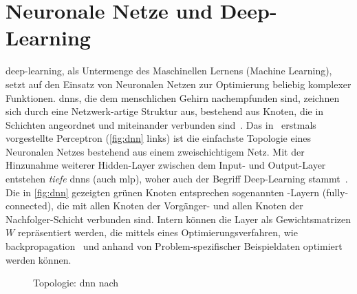 \section{Neuronale Netze und Deep-Learning}
\label{sec:deep-learning}

\gls{deep-learning}, als Untermenge des Maschinellen Lernens (Machine Learning), setzt auf den Einsatz von Neuronalen Netzen zur Optimierung beliebig komplexer Funktionen.
\glspl{dnn}, die dem menschlichen Gehirn nachempfunden sind, zeichnen sich durch eine Netzwerk-artige Struktur aus, bestehend aus Knoten, die in Schichten angeordnet und miteinander verbunden sind~\cite{Burkov19}.
Das in~\cite{rosenblatt58} erstmals vorgestellte Perceptron (\autoref{fig:dnn} links) ist die einfachste Topologie eines Neuronalen Netzes bestehend aus einem zweischichtigem Netz.
Mit der Hinzunahme weiterer \sog Hidden-Layer zwischen dem Input- und Output-Layer entstehen \emph{tiefe} \glspl{dnn} (auch \gls{mlp}), woher auch der Begriff Deep-Learning stammt~\cite{Burkov19}.
Die in \autoref{fig:dnn} gezeigten grünen Knoten entsprechen sogenannten \fc-Layern (fully-connected), die mit allen Knoten der Vorgänger- und allen Knoten der Nachfolger-Schicht verbunden sind.
Intern können die Layer als Gewichtsmatrizen $W$ repräsentiert werden, die mittels eines Optimierungsverfahren, wie \gls{backpropagation}~\cite{rumelhart86} und anhand von Problem-spezifischer Beispieldaten optimiert werden können.

\begin{figure}
    \centering
    \caption{Topologie: \gls{dnn} nach~\cite{Veen17}}
    \label{fig:dnn}
\end{figure}




